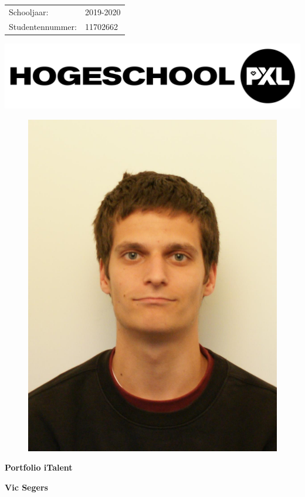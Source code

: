 \begin{titlepage}
  \begin{minipage}{0.58\linewidth}
    \begin{tabular}{l l}
    Schooljaar: & 2019-2020\\
    Studentennummer: & 11702662
  \end{tabular}
  \end{minipage}
  \begin{minipage}{0.4\linewidth}
    \includegraphics[width=\linewidth]{images/hogeschool_pxl.png}
  \end{minipage}
  \hspace{0pt}
  \vfill
  \begin{figure}[h!]
    \centering
    \includegraphics[width=0.40\linewidth]{images/Vic_Segers.jpg}
  \end{figure}
  \begin{center}
    \Huge\textbf{{Portfolio iTalent}}
  \end{center}
  \begin{center}
    \Large\textbf{Vic Segers}
  \end{center}
  \vfill
  \hspace{0pt}
\end{titlepage}
